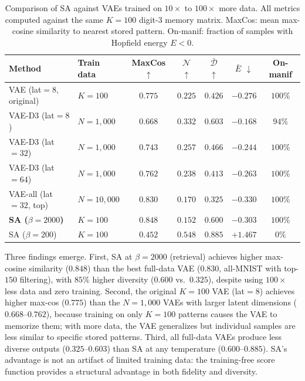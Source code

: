 \begin{table}[h]
\centering
\caption{Comparison of SA against VAEs trained on $10{\times}$ to $100{\times}$ more data. All metrics computed against the same $K{=}100$ digit-3 memory matrix. MaxCos: mean max-cosine similarity to nearest stored pattern. On-manif: fraction of samples with Hopfield energy $E<0$.}
\label{tab:full-vae}
\small
\begin{tabular}{@{}llccccc@{}}
\toprule
Method & Train data & MaxCos $\uparrow$ & $\mathcal{N}$ $\uparrow$ & $\bar{\mathcal{D}}$ $\uparrow$ & $\bar{E}$ $\downarrow$ & On-manif \\
\midrule
VAE (lat${=}8$, original)  & $K{=}100$ & $0.775$ & $0.225$ & $0.426$ & $-0.276$ & $100\%$ \\
VAE-D3 (lat${=}8$)         & $N{=}1{,}000$ & $0.668$ & $0.332$ & $0.603$ & $-0.168$ & $94\%$ \\
VAE-D3 (lat${=}32$)        & $N{=}1{,}000$ & $0.743$ & $0.257$ & $0.466$ & $-0.244$ & $100\%$ \\
VAE-D3 (lat${=}64$)        & $N{=}1{,}000$ & $0.762$ & $0.238$ & $0.413$ & $-0.263$ & $100\%$ \\
VAE-all (lat${=}32$, top)  & $N{=}10{,}000$ & $0.830$ & $0.170$ & $0.325$ & $-0.330$ & $100\%$ \\
\midrule
\textbf{SA ($\beta{=}2000$)} & $K{=}100$ & $\mathbf{0.848}$ & $0.152$ & $\mathbf{0.600}$ & $-0.303$ & $100\%$ \\
SA ($\beta{=}200$)          & $K{=}100$ & $0.452$ & $\mathbf{0.548}$ & $\mathbf{0.885}$ & $+1.467$ & $0\%$ \\
\bottomrule
\end{tabular}
\end{table}

Three findings emerge. First, SA at $\beta{=}2000$ (retrieval) achieves higher max-cosine similarity ($0.848$) than the best full-data VAE ($0.830$, all-MNIST with top-$150$ filtering), with $85\%$ higher diversity ($0.600$ vs.\ $0.325$), despite using $100{\times}$ less data and zero training. Second, the original $K{=}100$ VAE (lat${=}8$) achieves higher max-cos ($0.775$) than the $N{=}1{,}000$ VAEs with larger latent dimensions ($0.668$--$0.762$), because training on only $K{=}100$ patterns causes the VAE to memorize them; with more data, the VAE generalizes but individual samples are less similar to specific stored patterns. Third, all full-data VAEs produce less diverse outputs ($0.325$--$0.603$) than SA at any temperature ($0.600$--$0.885$). SA's advantage is not an artifact of limited training data: the training-free score function provides a structural advantage in both fidelity and diversity.

